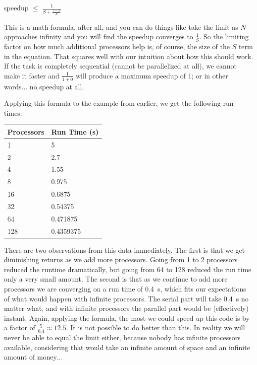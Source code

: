 \documentclass[a4paper]{report}
\begin{document}
\begin{center}
	speedup $\leq$ {\huge $\frac{1}{S + \frac{1-S}{N}}$}
\end{center}

This is a math formula, after all, and you can do things like take the limit as $N$ approaches infinity and you will find the speedup converges to $\frac{1}{S}$. So the limiting factor on how much additional processors help is, of course, the size of the $S$ term in the equation. That squares well with our intuition about how this should work. If the task is completely sequential (cannot be parallelized at all), we cannot make it faster and $\frac{1}{1 + 0}$ will produce a maximum speedup of 1; or in other words... no speedup at all.

Applying this formula to the example from earlier, we get the following run times:

\begin{center}
	\begin{tabular}{l|l}
		\textbf{Processors} & \textbf{Run Time (s)} \\ \hline
		1                   & 5                     \\
		2                   & 2.7                   \\
		4                   & 1.55                  \\
		8                   & 0.975                 \\
		16                  & 0.6875                \\
		32                  & 0.54375               \\
		64                  & 0.471875              \\
		128                 & 0.4359375             \\
	\end{tabular}
\end{center}

There are two observations from this data immediately. The first is that we get diminishing returns as we add more processors. Going from 1 to 2 processors reduced the runtime dramatically, but going from 64 to 128 reduced the run time only a very small amount. The second is that as we continue to add more processors we are converging on a run time of 0.4~s, which fits our expectations of what would happen with infinite processors. The serial part will take 0.4~s no matter what, and with infinite processors the parallel part would be (effectively) instant. Again, applying the formula, the most we could speed up this code is by a factor of $\frac{5}{0.4}\approx 12.5$. It is not possible to do better than this. In reality we will never be able to equal the limit either, because nobody has infinite processors available, considering that would take an infinite amount of space and an infinite amount of money...
\end{document}
